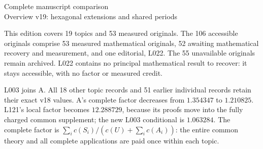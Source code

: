 \documentclass[11pt,a4paper]{article}
\begin{document}
\begin{center}{\Large Complete manuscript comparison}\\[3pt]
Overview v19: hexagonal extensions and shared periods\end{center}
This edition covers 19 topics and 53 measured originals. The 106 accessible originals comprise 53 measured mathematical originals, 52 awaiting mathematical recovery and measurement, and one editorial, L022. The 55 unavailable originals remain archived. L022 contains no principal mathematical result to recover: it stays accessible, with no factor or measured credit.

L003 joins A. All 18 other topic records and 51 earlier individual records retain their exact v18 values. A's complete factor decreases from $1.354347$ to $1.210825$. L121's local factor becomes $12.288729$, because its proofs move into the fully charged common supplement; the new L003 conditional is $1.063284$. The complete factor is $\sum_i c(S_i)/(c(U)+\sum_i c(A_i))$: the entire common theory and all complete applications are paid once within each topic.
\end{document}
